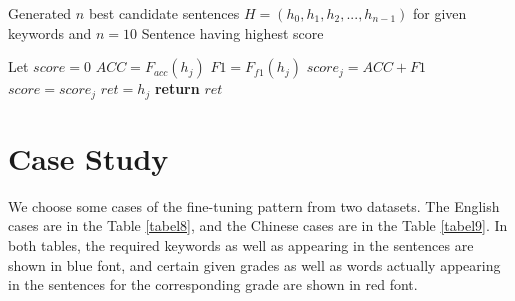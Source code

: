 \documentclass[11pt]{article}
\begin{document}
\renewcommand{\algorithmicrequire}{\textbf{Input:}}
\renewcommand{\algorithmicensure}{\textbf{Output:}}


\begin{algorithm}[!h]
 \begin{algorithmic}[1]
 \caption{Reranking Method}
 \label{alg:algorithm}
 \Require Generated $n$ best candidate sentences $H=(h_0, h_1, h_2,..., h_{n-1})$ for given keywords and $n=10$
 \Ensure Sentence having highest score
 
 \State Let $score=0$ 
  \State $ACC = F_{acc}(h_j)$
  \State $F1 = F_{f1}(h_j)$
  \State $score_j=ACC+F1$
   \State $score=score_j$
   \State $ret=h_j$
  \EndIf
  \EndFor
 \State \textbf{return} $ret$
 \end{algorithmic}
\end{algorithm}
\section{Case Study} \label{case}
We choose some cases of the fine-tuning pattern from two datasets. The English cases are in the Table \ref{tabel8}, and the Chinese cases are in the Table \ref{tabel9}. In both tables, the required keywords as well as appearing in the sentences are shown in blue font, and certain given grades as well as words actually appearing in the sentences for the corresponding grade are shown in red font.
\end{document}
